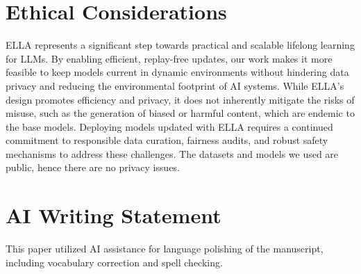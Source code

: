 \documentclass[11pt]{article}
\begin{document}


\section{Ethical Considerations}
ELLA represents a significant step towards practical and scalable lifelong learning for LLMs. By enabling efficient, replay-free updates, our work makes it more feasible to keep models current in dynamic environments without hindering data privacy and reducing the environmental footprint of AI systems. While ELLA's design promotes efficiency and privacy, it does not inherently mitigate the risks of misuse, such as the generation of biased or harmful content, which are endemic to the base models. Deploying models updated with ELLA requires a continued commitment to responsible data curation, fairness audits, and robust safety mechanisms to address these challenges. The datasets and models we used are public, hence there are no privacy issues.

\section{AI Writing Statement}
This paper utilized AI assistance for language polishing of the manuscript, including vocabulary correction and spell checking.


\end{document}
